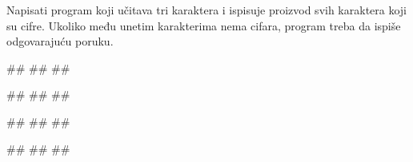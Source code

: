 \begin{Exercise}[label=KT_NG_10] 
Napisati program koji učitava tri karaktera i ispisuje proizvod svih karaktera koji su cifre. 
Ukoliko među unetim karakterima nema cifara, program treba da ispiše odgovarajuću poruku.

\begin{miditest}
\begin{upotreba}{1}
#\naslovInt#
##
##
\end{upotreba}
\end{miditest}
\begin{miditest}
\begin{upotreba}{2}
#\naslovInt#
##
##
\end{upotreba}
\end{miditest}

\begin{miditest}
\begin{upotreba}{3}
#\naslovInt#
##
##
\end{upotreba}
\end{miditest}
\begin{miditest}
\begin{upotreba}{4}
#\naslovInt#
##
##
\end{upotreba}
\end{miditest}

\end{Exercise}
\ifresenja
 \begin{Answer}[ref=KT_NG_10]
\end{Answer}
\fi


